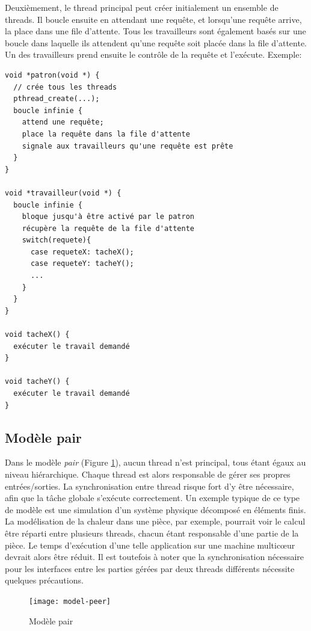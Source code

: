 Deuxièmement, le thread principal peut créer initialement un ensemble de threads. Il boucle ensuite en attendant une requête, et lorsqu'une requête arrive, la place dans une file d'attente. Tous les travailleurs sont également basés sur une boucle dans laquelle ils attendent qu'une requête soit placée dans la file d'attente. Un des travailleurs prend ensuite le contrôle de la requête et l'exécute.
\newpage
Exemple:

\begin{mdframed}
  \begin{lstlisting}
void *patron(void *) {
  // crée tous les threads
  pthread_create(...);
  boucle infinie {
    attend une requête;
    place la requête dans la file d'attente
    signale aux travailleurs qu'une requête est prête
  }
}

void *travailleur(void *) {
  boucle infinie {
    bloque jusqu'à être activé par le patron
    récupère la requête de la file d'attente
    switch(requete){
      case requeteX: tacheX();
      case requeteY: tacheY();
      ...
    }
  }
}

void tacheX() {
  exécuter le travail demandé
}

void tacheY() {
  exécuter le travail demandé
}
\end{lstlisting}
\end{mdframed}

\subsection{Modèle pair}

Dans le modèle \emph{pair} (Figure \ref{fig:model-peer}), aucun thread n'est principal, tous étant égaux au niveau hiérarchique. Chaque thread est alors responsable de gérer ses propres entrées/sorties. La synchronisation entre thread risque fort d'y être nécessaire, afin que la tâche globale s'exécute correctement. Un exemple typique de ce type de modèle est une simulation d'un système physique décomposé en éléments finis. La modélisation de la chaleur dans une pièce, par exemple, pourrait voir le calcul être réparti entre plusieurs threads, chacun étant responsable d'une partie de la pièce. Le temps d'exécution d'une telle application sur une machine multicœur devrait alors être réduit. Il est toutefois à noter que la synchronisation nécessaire pour les interfaces entre les parties gérées par deux threads différents nécessite quelques précautions.


\begin{figure}[ht]
  \centering
  \texttt{[image: model-peer]}
  \caption{\label{fig:model-peer}Modèle pair}
\end{figure}


